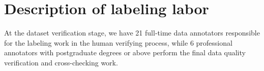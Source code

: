 \section{Description of labeling labor}
\label{xsec:labeling_labor}

At the dataset verification stage, we have 21 full-time data annotators responsible for the labeling work in the human verifying process, while 6 professional annotators with postgraduate degrees or above perform the final data quality verification and cross-checking work. 